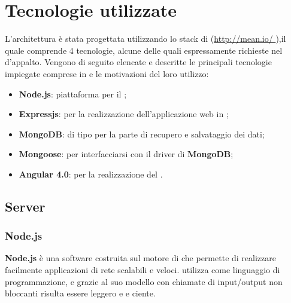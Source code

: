 \section{Tecnologie utilizzate}
L'architettura è stata progettata utilizzando lo stack di \textbf{} (\url {http://mean.io/ } ),il quale comprende 4 tecnologie, alcune delle quali espressamente richieste nel  d’appalto. Vengono di seguito elencate e descritte le principali tecnologie impiegate comprese in \textbf{} e le motivazioni del loro utilizzo:
\begin{itemize}
\item \textbf{Node.js}: piattaforma per il ;
\item \textbf{Expressjs}:  per la realizzazione dell’applicazione web in  ;
\item \textbf{MongoDB}:  di tipo  per la parte di recupero e salvataggio dei dati;
\item \textbf{Mongoose}:  per interfacciarsi con il driver di \textbf{MongoDB};
\item \textbf{Angular 4.0}:   per la realizzazione del  .
\end{itemize}

	\subsection{Server}
	\subsubsection{Node.js}
\textbf{Node.js} è una  software costruita sul motore  di  che permette di realizzare facilmente applicazioni di rete scalabili e veloci.  utilizza  come linguaggio di programmazione, e grazie al suo modello  con chiamate di input/output non bloccanti risulta essere leggero e e ciente.

